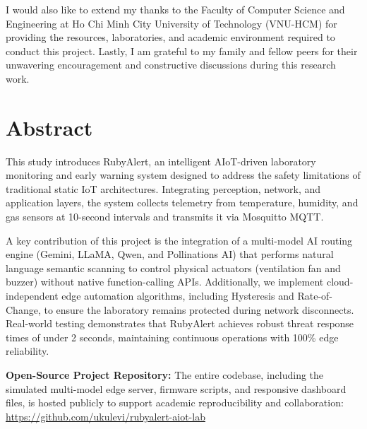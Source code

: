 \documentclass[12pt,a4paper]{report}
\begin{document}
I would also like to extend my thanks to the Faculty of Computer Science and Engineering at Ho Chi Minh City University of Technology (VNU-HCM) for providing the resources, laboratories, and academic environment required to conduct this project. Lastly, I am grateful to my family and fellow peers for their unwavering encouragement and constructive discussions during this research work.
\newpage

\chapter*{Abstract}
\label{ch:abstract}
This study introduces RubyAlert, an intelligent AIoT-driven laboratory monitoring and early warning system designed to address the safety limitations of traditional static IoT architectures. Integrating perception, network, and application layers, the system collects telemetry from temperature, humidity, and gas sensors at 10-second intervals and transmits it via Mosquitto MQTT. 

A key contribution of this project is the integration of a multi-model AI routing engine (Gemini, LLaMA, Qwen, and Pollinations AI) that performs natural language semantic scanning to control physical actuators (ventilation fan and buzzer) without native function-calling APIs. Additionally, we implement cloud-independent edge automation algorithms, including Hysteresis and Rate-of-Change, to ensure the laboratory remains protected during network disconnects. Real-world testing demonstrates that RubyAlert achieves robust threat response times of under 2 seconds, maintaining continuous operations with 100\% edge reliability.

\begin{tcolorbox}[colback=navyblue!5, colframe=navyblue, arc=1.5mm, boxrule=0.5pt, left=4mm, right=4mm, top=3mm, bottom=3mm]
    \footnotesize\color{navyblue}
    \textbf{Open-Source Project Repository:} The entire codebase, including the simulated multi-model edge server, firmware scripts, and responsive dashboard files, is hosted publicly to support academic reproducibility and collaboration: \url{https://github.com/ukulevi/rubyalert-aiot-lab}
\end{tcolorbox}
\newpage

\listoffigures
{}
\newpage
\end{document}
